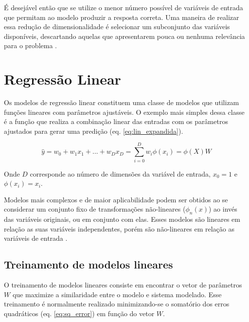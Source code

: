 É desejável então que se utilize o menor número possível de variáveis de entrada que permitam ao modelo produzir a resposta correta. Uma maneira de realizar essa redução de dimensionalidade é selecionar um subconjunto das variáveis disponíveis, descartando aquelas que apresentarem pouca ou nenhuma relevância para o problema \cite[p. 204]{intro_stat_learn}.


\section{Regressão Linear}

Os modelos de regressão linear constituem uma classe de modelos que utilizam funções lineares com parâmetros ajustáveis. O exemplo mais simples dessa classe é a função que realiza a combinação linear das entradas com os parâmetros ajustados para gerar uma predição (eq. \ref{eq:lin_expandida}).

\begin{equation}
    \hat{y} = w_0 + w_1x_1+ ... + w_Dx_D = \sum_{i = 0}^{D} w_i\phi(x_i) = \phi(X)W
    \label{eq:lin_expandida}
\end{equation}

Onde $D$ corresponde ao número de dimensões da variável de entrada, $x_0 = 1$ e $\phi(x_i) = x_i$.

Modelos mais complexos e de maior aplicabilidade podem ser obtidos ao se considerar um conjunto fixo de transformações não-lineares ($\phi_n(x)$) ao invés das variáveis originais, ou em conjunto com elas. Esses modelos são lineares em relação as suas variáveis independentes, porém são não-lineares em relação as variáveis de entrada \cite{bishop_2006}.

\subsection{Treinamento de modelos lineares}

O treinamento de modelos lineares consiste em encontrar o vetor de parâmetros $W$ que maximize a similaridade entre o modelo e sistema modelado. Esse treinamento é normalmente realizado minimizando-se o somatório dos erros quadráticos (eq. \ref{eq:sq_error}) em função do vetor $W$.


